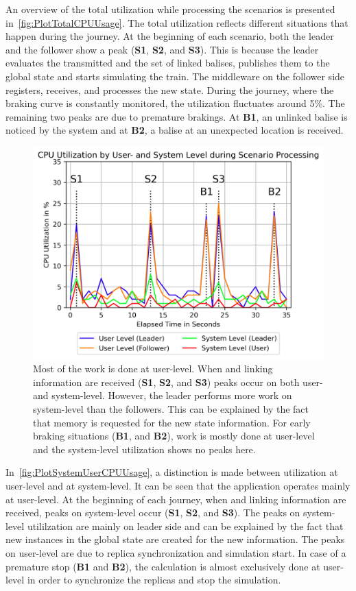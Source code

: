 An overview of the total  utilization while processing the scenarios is presented in~\autoref{fig:PlotTotalCPUUsage}.
The total  utilization reflects different situations that happen during the journey.
At the beginning of each scenario, both the leader and the follower show a peak (\textbf{S1}, \textbf{S2}, and \textbf{S3}).
This is because the leader evaluates the transmitted  and the set of linked balises, publishes them to the global state and starts simulating the train.
The middleware on the follower side registers, receives, and processes the new state.
During the journey, where the braking curve is constantly monitored, the utilization fluctuates around 5\%.
The remaining two peaks are due to premature brakings.
At \textbf{B1}, an unlinked balise is noticed by the system and at \textbf{B2}, a balise at an unexpected location is received.

\begin{figure}[!hbt]
	\centering
	\includegraphics[width=0.8\linewidth]{images/plots/SystemUserCPUUsage}
	\caption{Most of the  work is done at user-level. When  and linking information are received (\textbf{S1}, \textbf{S2}, and \textbf{S3}) peaks occur on both user- and system-level. However, the leader performs more work on system-level than the followers. This can be explained by the fact that memory is requested for the new state information. For early braking situations (\textbf{B1}, and \textbf{B2}), work is mostly done at user-level and the system-level utilization shows no peaks here.}
	\label{fig:PlotSystemUserCPUUsage}
\end{figure}

In~\autoref{fig:PlotSystemUserCPUUsage}, a distinction is made between  utilization at user-level and at system-level.
It can be seen that the application operates mainly at user-level.
At the beginning of each journey, when  and linking information are received, peaks on system-level occur (\textbf{S1}, \textbf{S2}, and \textbf{S3}).
The peaks on system-level utililzation are mainly on leader side and can be explained by the fact that new instances in the global state are created for the new information.
The peaks on user-level are due to replica synchronization and simulation start.
In case of a premature stop (\textbf{B1} and \textbf{B2}), the calculation is almost exclusively done at user-level in order to synchronize the replicas and stop the simulation.

